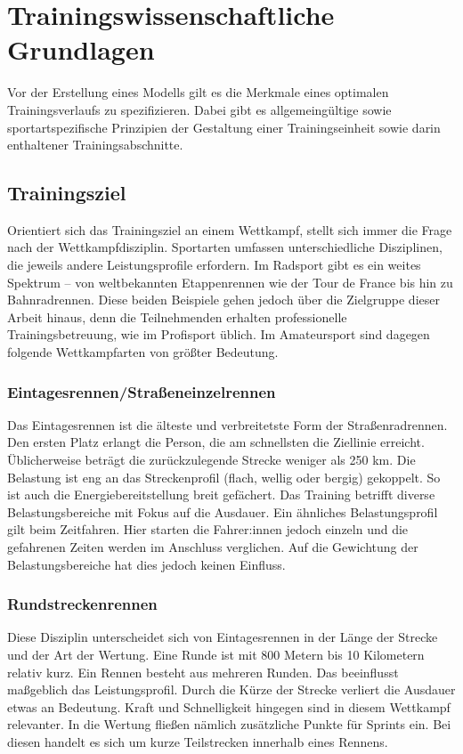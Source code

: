 \chapter{Trainingswissenschaftliche Grundlagen}
\label{sec:grundlagen:rad}
Vor der Erstellung eines Modells gilt es die Merkmale eines optimalen Trainingsverlaufs zu spezifizieren. Dabei gibt es allgemeingültige sowie sportartspezifische Prinzipien der Gestaltung einer Trainingseinheit sowie darin enthaltener Trainingsabschnitte.

\section{Trainingsziel}
Orientiert sich das Trainingsziel an einem Wettkampf, stellt sich immer die Frage nach der Wettkampfdisziplin. Sportarten umfassen unterschiedliche Disziplinen, die jeweils andere Leistungsprofile erfordern. Im Radsport gibt es ein weites Spektrum -- von weltbekannten Etappenrennen wie der Tour de France bis hin zu Bahnradrennen. Diese beiden Beispiele gehen jedoch über die Zielgruppe dieser Arbeit hinaus, denn die Teilnehmenden erhalten professionelle Trainingsbetreuung, wie im Profisport üblich. Im Amateursport sind dagegen folgende Wettkampfarten von größter Bedeutung.
\subsection{Eintagesrennen/Straßeneinzelrennen}
\label{eintagesrennen}
Das Eintagesrennen ist die älteste und verbreitetste Form der Straßenradrennen. Den ersten Platz erlangt die Person, die am schnellsten die Ziellinie erreicht.
Üblicherweise beträgt die zurückzulegende Strecke weniger als 250 km. Die Belastung ist eng an das Streckenprofil (flach, wellig oder bergig) gekoppelt. So ist auch die Energiebereitstellung breit gefächert. Das Training betrifft diverse Belastungsbereiche mit Fokus auf die Ausdauer.
Ein ähnliches Belastungsprofil gilt beim Zeitfahren. Hier starten die Fahrer:innen jedoch einzeln und die gefahrenen Zeiten werden im Anschluss verglichen. Auf die Gewichtung der Belastungsbereiche hat dies jedoch keinen Einfluss. 
\subsection{Rundstreckenrennen}
Diese Disziplin unterscheidet sich von Eintagesrennen in der Länge der Strecke und der Art der Wertung. Eine Runde ist mit 800 Metern bis 10 Kilometern relativ kurz. Ein Rennen besteht aus mehreren Runden. 
Das beeinflusst maßgeblich das Leistungsprofil. Durch die Kürze der Strecke verliert die Ausdauer etwas an Bedeutung. Kraft und Schnelligkeit hingegen sind in diesem Wettkampf relevanter. In die Wertung fließen nämlich zusätzliche Punkte für Sprints ein. Bei diesen handelt es sich um kurze Teilstrecken innerhalb eines Rennens. 

